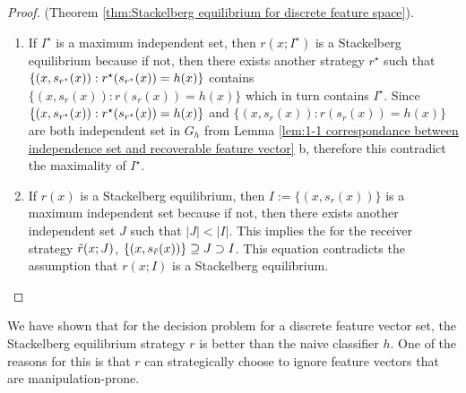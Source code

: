 \begin{proof}(Theorem \ref{thm:Stackelberg equilibrium for discrete feature space}).
	\begin{enumerate}[label=(\alph*)]
		\item If $I^{\star}$ is a maximum  independent set, then $r(x; I^{\star})$ is a Stackelberg equilibrium because if not, then there exists another strategy $r^{\star}$ such that $\{(x,s_{r^{\star}}(x)):r^{\star}(s_{r^{\star}}(x)) = h(x)\}$ contains $\{(x,s_r(x)): r(s_r(x)) = h(x)\}$ which in turn contains $I^\star$. Since $\{(x,s_{r^{\star}}(x)):r^{\star}(s_{r^{\star}}(x)) = h(x)\}$ and $\{(x,s_r(x)): r(s_r(x)) = h(x)\}$ are both independent set in $G_h$ from Lemma \ref{lem:1-1 correspondance between independence set and recoverable feature vector} b, therefore this contradict the maximality of $I^\star$.
		\item If $r(x)$ is a Stackelberg equilibrium, then $I := \{(x,s_r(x))\}$ is a maximum independent set because if not, then there exists another independent set $J$ such that $|J| < |I|$. This implies the for the receiver strategy $\tilde{r}(x;J)$, $\{(x,s_{\tilde{r}}(x))\} \supseteq J \supset I$. This equation contradicts the assumption that $r(x;I)$ is a Stackelberg equilibrium. 
	\end{enumerate}
	
\end{proof}

We have shown that for the decision problem for a discrete feature vector set, the Stackelberg equilibrium strategy $r$ is better than the naive classifier $h$. One of the reasons for this is that $r$ can strategically choose to ignore feature vectors that are manipulation-prone. 